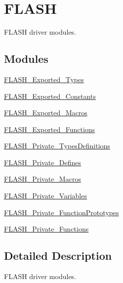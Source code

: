 \hypertarget{group___f_l_a_s_h}{}\section{F\+L\+A\+SH}
\label{group___f_l_a_s_h}


F\+L\+A\+SH driver modules.  


\subsection*{Modules}
\begin{DoxyCompactItemize}
\item 
\mbox{\hyperlink{group___f_l_a_s_h___exported___types}{F\+L\+A\+S\+H\+\_\+\+Exported\+\_\+\+Types}}
\item 
\mbox{\hyperlink{group___f_l_a_s_h___exported___constants}{F\+L\+A\+S\+H\+\_\+\+Exported\+\_\+\+Constants}}
\item 
\mbox{\hyperlink{group___f_l_a_s_h___exported___macros}{F\+L\+A\+S\+H\+\_\+\+Exported\+\_\+\+Macros}}
\item 
\mbox{\hyperlink{group___f_l_a_s_h___exported___functions}{F\+L\+A\+S\+H\+\_\+\+Exported\+\_\+\+Functions}}
\item 
\mbox{\hyperlink{group___f_l_a_s_h___private___types_definitions}{F\+L\+A\+S\+H\+\_\+\+Private\+\_\+\+Types\+Definitions}}
\item 
\mbox{\hyperlink{group___f_l_a_s_h___private___defines}{F\+L\+A\+S\+H\+\_\+\+Private\+\_\+\+Defines}}
\item 
\mbox{\hyperlink{group___f_l_a_s_h___private___macros}{F\+L\+A\+S\+H\+\_\+\+Private\+\_\+\+Macros}}
\item 
\mbox{\hyperlink{group___f_l_a_s_h___private___variables}{F\+L\+A\+S\+H\+\_\+\+Private\+\_\+\+Variables}}
\item 
\mbox{\hyperlink{group___f_l_a_s_h___private___function_prototypes}{F\+L\+A\+S\+H\+\_\+\+Private\+\_\+\+Function\+Prototypes}}
\item 
\mbox{\hyperlink{group___f_l_a_s_h___private___functions}{F\+L\+A\+S\+H\+\_\+\+Private\+\_\+\+Functions}}
\end{DoxyCompactItemize}


\subsection{Detailed Description}
F\+L\+A\+SH driver modules. 

